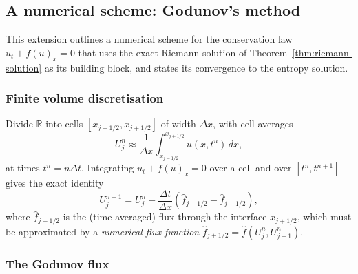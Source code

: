 \subsection{A numerical scheme: Godunov's method}
\label{subsec:godunov}

This extension outlines a numerical scheme for the conservation law
$u_t+f(u)_x=0$ that uses the exact Riemann solution of
Theorem~\ref{thm:riemann-solution} as its building block, and states its
convergence to the entropy solution.

\subsubsection{Finite volume discretisation}
\label{subsubsec:finite-volume}

Divide $\mathbb{R}$ into cells $[x_{j-1/2}, x_{j+1/2}]$ of width $\Delta
x$, with cell averages
\begin{equation}
  U_j^n \approx \frac{1}{\Delta x}\int_{x_{j-1/2}}^{x_{j+1/2}} u(x, t^n)\, dx,
\end{equation}
at times $t^n = n\Delta t$. Integrating $u_t+f(u)_x=0$ over a cell and
over $[t^n,t^{n+1}]$ gives the exact identity
\begin{equation}
  U_j^{n+1} = U_j^n - \frac{\Delta t}{\Delta x}
  \left( \widehat{f}_{j+1/2} - \widehat{f}_{j-1/2} \right),
\end{equation}
where $\widehat f_{j+1/2}$ is the (time-averaged) flux through the
interface $x_{j+1/2}$, which must be approximated by a \emph{numerical
flux function} $\widehat f_{j+1/2} = \widehat f(U_j^n, U_{j+1}^n)$.

\subsubsection{The Godunov flux}
\label{subsubsec:godunov-flux}

